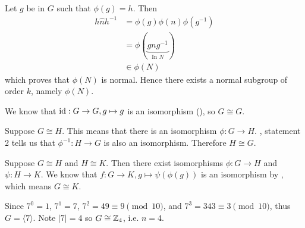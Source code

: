 \begin{questions}
    Let $g$ be in $G$ such that $\phi(g) = h$. Then
    \begin{align*}
        h\hat{n}h^{-1} &= \phi(g)\phi(n)\phi(g^{-1})\\
        &= \phi(\underbrace{gng^{-1}}_{\text{In } N})\\
        &\in \phi(N)
    \end{align*}
    which proves that $\phi(N)$ is normal. Hence there exists a normal subgroup of order $k$, namely $\phi(N)$.

    \item \begin{partquestions}{\alph*}
        \item We know that $\mathrm{id}: G \to G, g \mapsto g$ is an isomorphism (), so $G \cong G$.
        \item Suppose $G \cong H$. This means that there is an isomorphism $\phi: G \to H$. , statement 2 tells us that $\phi^{-1}: H \to G$ is also an isomorphism. Therefore $H \cong G$.
        \item Suppose $G \cong H$ and $H \cong K$. Then there exist isomorphisms $\phi: G \to H$ and $\psi: H \to K$. We know that $f: G \to K, g \mapsto \psi(\phi(g))$ is an isomorphism by , which means $G \cong K$.
    \end{partquestions}

    \item Since $7^0 = 1$, $7^1 = 7$, $7^2 = 49 \equiv 9 \pmod{10}$, and $7^3 = 343 \equiv 3 \pmod{10}$, thus $G = \langle 7 \rangle$. Note $|7| = 4$ so $G \cong \mathbb{Z}_4$, i.e. $n = 4$.
\end{questions}